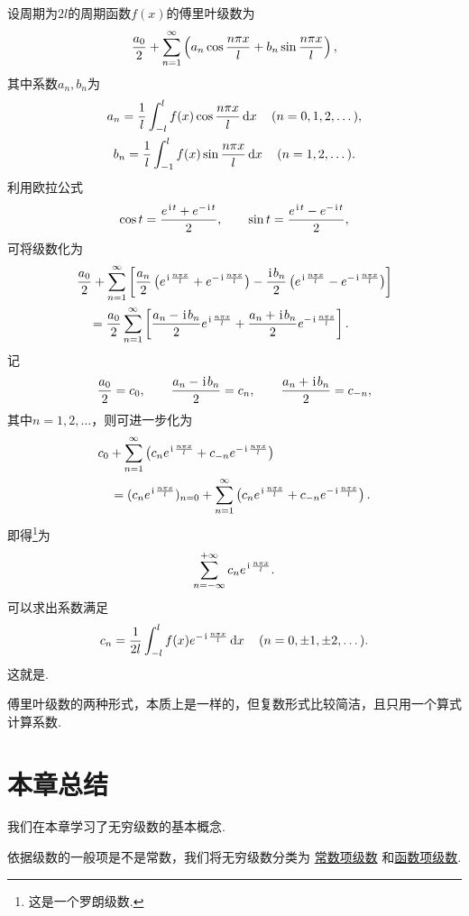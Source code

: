设周期为\(2l\)的周期函数\(f(x)\)的傅里叶级数为\[
\frac{a_0}{2} + \s \left( a_n \cos\f + b_n \sin\f \right),
\]其中系数\(a_n,b_n\)为\begin{gather*}
a_n = \frac{1}{l} \int_{-l}^{l} f(x) \cos\f \dd{x}
\quad(n=0,1,2,\dotsc), \\
b_n = \frac{1}{l} \int_{-1}^{l} f(x) \sin\f \dd{x}
\quad(n=1,2,\dotsc).
\end{gather*}利用欧拉公式\[
\cos t = \frac{e^{\iu t}+e^{-\iu t}}{2},
\qquad
\sin t = \frac{e^{\iu t}-e^{-\iu t}}{2},
\]可将级数化为\[
\begin{split}
&\frac{a_0}{2} + \s \left[
	\frac{a_n}{2} \left( \eif{} + \eif- \right)
	-\frac{\iu b_n}{2} \left( \eif{} - \eif- \right)
\right] \\
&\hspace{10pt}= \frac{a_0}{2} \s \left[
	\frac{a_n - \iu b_n}{2} \eif{}
	+ \frac{a_n + \iu b_n}{2} \eif-
\right].
\end{split}
\]记\[
\frac{a_0}{2} = c_0,
\qquad
\frac{a_n-\iu b_n}{2} = c_n,
\qquad
\frac{a_n+\iu b_n}{2} = c_{-n},
\]其中\(n=1,2,\dotsc\)，则可进一步化为\[
\begin{split}
&c_0 + \s \left(
	c_n \eif{} + c_{-n} \eif-
\right) \\
&\hspace{10pt}= (c_n \eif{})_{n=0}
+ \s \left(
	c_n \eif{} + c_{-n} \eif-
\right).
\end{split}
\]即得\footnote{这是一个罗朗级数.}为
\begin{equation}\label{equation:无穷级数.傅里叶级数的复数形式}
\sum\limits_{n=-\infty}^{+\infty} c_n \eif{}.
\end{equation}可以求出系数满足
\begin{equation}\label{equation:无穷级数.傅里叶系数的复数形式}
c_n = \frac{1}{2l} \int_{-l}^l f(x) \eif- \dd{x}
\quad(n=0,\pm1,\pm2,\dotsc).
\end{equation}这就是.

傅里叶级数的两种形式，本质上是一样的，但复数形式比较简洁，且只用一个算式计算系数.

\section{本章总结}

我们在本章学习了无穷级数的基本概念.

依据级数的一般项是不是常数，我们将无穷级数分类为%
\hyperref[definition:无穷级数.常数项级数的定义]{常数项级数}%
和\hyperref[definition:无穷级数.实函数项级数的概念]{函数项级数}.

